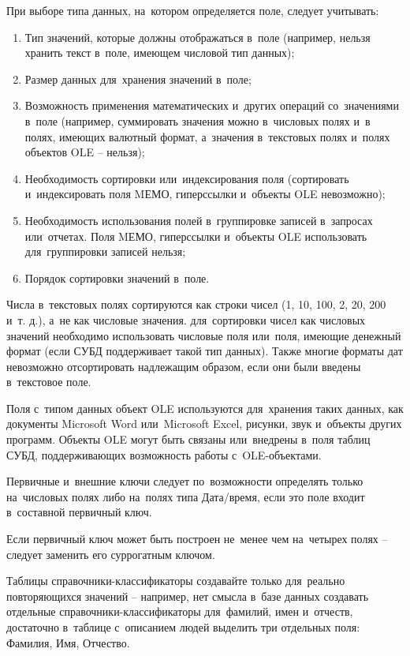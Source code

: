\documentclass{ou}
\begin{document}
При выборе типа данных, на~котором определяется поле, следует учитывать:
\begin{enumerate}[itemindent=4em, nosep, label=\arabic*)]
\item Тип значений, которые должны отображаться в~поле (например, нельзя хранить текст в~поле, имеющем числовой тип данных);
\item Размер данных для~хранения значений в~поле;
\item Возможность применения математических и~других операций со~значениями в~поле (например, суммировать значения можно в~числовых полях и~в полях, имеющих валютный формат, а~значения в~текстовых полях и~полях объектов OLE -- нельзя);
\item Необходимость сортировки или~индексирования поля (сортировать и~индексировать поля MЕМО, гиперссылки и~объекты OLE невозможно);
\item Необходимость использования полей в~группировке записей в~запросах или~отчетах. Поля MЕМО, гиперссылки и~объекты OLE использовать для~группировки записей нельзя;
\item Порядок сортировки значений в~поле.
\end{enumerate}

Числа в~текстовых полях сортируются как строки чисел (1, 10, 100, 2, 20, 200 и~т. д.), а~не как числовые значения. для~сортировки чисел как числовых значений необходимо использовать числовые поля или~поля, имеющие денежный формат (если СУБД поддерживает такой тип данных). Также многие форматы дат невозможно отсортировать надлежащим образом, если они были введены в~текстовое поле.

Поля с~типом данных объект OLE используются для~хранения таких данных, как документы Microsoft Word или~Microsoft Excel, рисунки, звук и~объекты других программ. Объекты OLE могут быть связаны или~внедрены в~поля таблиц СУБД, поддерживающих возможность работы с~OLE-объектами.

Первичные и~внешние ключи следует по~возможности определять только на~числовых полях либо на~полях типа Дата/время, если это поле входит в~составной первичный ключ.

Если первичный ключ может быть построен не~менее чем на~четырех полях -- следует заменить его суррогатным ключом.

Таблицы справочники-классификаторы создавайте только для~реально повторяющихся значений -- например, нет смысла в~базе данных создавать отдельные справочники-классификаторы для~фамилий, имен и~отчеств, достаточно в~таблице с~описанием людей выделить три отдельных поля: Фамилия, Имя, Отчество.
\end{document}
